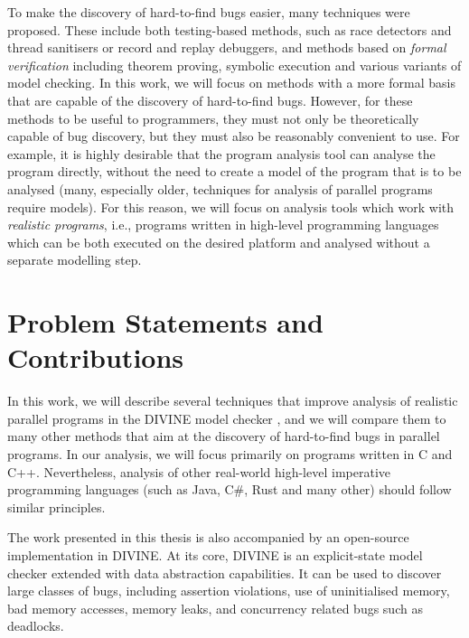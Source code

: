To make the discovery of hard-to-find bugs easier, many techniques were proposed.
These include both testing-based methods, such as race detectors and thread sanitisers or record and replay debuggers, and methods based on \emph{formal verification} including theorem proving, symbolic execution and various variants of model checking.
In this work, we will focus on methods with a more formal basis that are capable of the discovery of hard-to-find bugs.
However, for these methods to be useful to programmers, they must not only be theoretically capable of bug discovery, but they must also be reasonably convenient to use.
For example, it is highly desirable that the program analysis tool can analyse the program directly, without the need to create a model of the program that is to be analysed (many, especially older, techniques for analysis of parallel programs require models).
For this reason, we will focus on analysis tools which work with \emph{realistic programs}, i.e., programs written in high-level programming languages which can be both executed on the desired platform and analysed without a separate modelling step.

\section{Problem Statements and Contributions}

In this work, we will describe several techniques that improve analysis of realistic parallel programs in the DIVINE model checker , and we will compare them to many other methods that aim at the discovery of hard-to-find bugs in parallel programs.
In our analysis, we will focus primarily on programs written in C and C++.
Nevertheless, analysis of other real-world high-level imperative programming
languages (such as Java, C\#, Rust and many other) should follow similar
principles.

The work presented in this thesis is also accompanied by an open-source implementation in DIVINE.
At its core, DIVINE is an explicit-state model checker extended with data abstraction capabilities.
It can be used to discover large classes of bugs, including assertion violations, use of uninitialised memory, bad memory accesses, memory leaks, and concurrency related bugs such as deadlocks.

